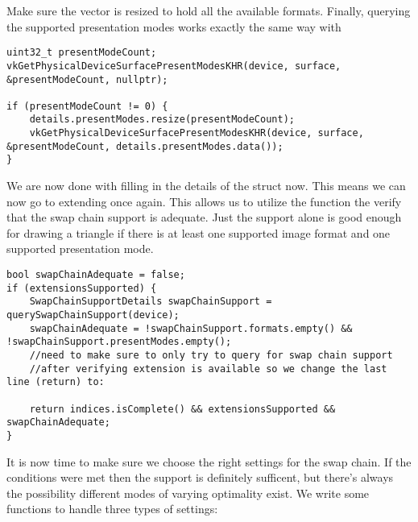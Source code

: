 \par Make sure the vector is resized to hold all the available formats. Finally, querying the supported presentation modes works exactly the same way with \\

\begin{center}
\begin{minipage}{0.95\linewidth}
\begin{lstlisting}
uint32_t presentModeCount;
vkGetPhysicalDeviceSurfacePresentModesKHR(device, surface, &presentModeCount, nullptr);

if (presentModeCount != 0) {
    details.presentModes.resize(presentModeCount);
    vkGetPhysicalDeviceSurfacePresentModesKHR(device, surface, &presentModeCount, details.presentModes.data());
}
\end{lstlisting}
\end{minipage}
\end{center}

\par We are now done with filling in the details of the struct now. This means we can now go to extending  once again. This allows us to utilize the function the verify that the swap chain support is adequate. Just the support alone is good enough for drawing a triangle if there is at least one supported image format and one supported presentation mode.

\begin{center}
\begin{minipage}{0.95\linewidth}
\begin{lstlisting}
bool swapChainAdequate = false;
if (extensionsSupported) {
    SwapChainSupportDetails swapChainSupport = querySwapChainSupport(device);
    swapChainAdequate = !swapChainSupport.formats.empty() && !swapChainSupport.presentModes.empty();
    //need to make sure to only try to query for swap chain support
    //after verifying extension is available so we change the last line (return) to:

    return indices.isComplete() && extensionsSupported && swapChainAdequate;
}
\end{lstlisting}
\end{minipage}
\end{center}


\par It is now time to make sure we choose the right settings for the swap chain. If the 
 conditions were met then the support is definitely sufficent,
but there's always the possibility different modes of varying optimality exist. We write some functions to handle three types of settings:

